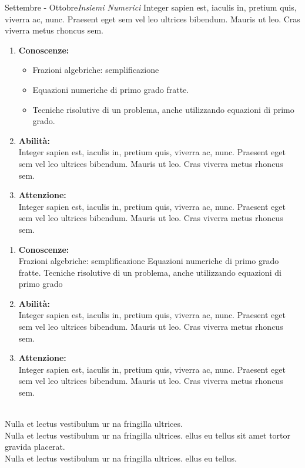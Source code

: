 \documentclass[10pt, a4paper twoside, notitlepage, notoc, justified]{tufte-handout}
\begin{document}
\begin{loggentry}{Settembre - Ottobre}{\em Insiemi Numerici}
Integer sapien est, iaculis in, pretium quis, viverra ac, nunc. Praesent eget sem vel leo ultrices bibendum. Mauris ut leo. Cras viverra metus rhoncus sem.

\begin{multicols}{2}
{\small
	\begin{enumerate}
		\item {\bf Conoscenze:}
		\begin{itemize}
			\item Frazioni algebriche: semplificazione
			\item Equazioni numeriche di primo grado fratte.
			\item Tecniche risolutive di un problema, anche utilizzando equazioni di primo grado.
			\end{itemize}
		\item {\bf Abilità:}\\ Integer sapien est, iaculis in, pretium quis, viverra ac, nunc. Praesent eget sem vel leo ultrices bibendum. Mauris ut leo. Cras viverra metus rhoncus sem.
		\item {\bf Attenzione:}\\ Integer sapien est, iaculis in, pretium quis, viverra ac, nunc. Praesent eget sem vel leo ultrices bibendum. Mauris ut leo. Cras viverra metus rhoncus sem.
	\end{enumerate} 
\columnbreak

\begin{enumerate}
		\item {\bf Conoscenze:}\\ Frazioni algebriche: semplificazione
Equazioni numeriche di primo grado fratte.
Tecniche risolutive di un problema, anche utilizzando equazioni di primo grado
		\item {\bf Abilità:}\\ Integer sapien est, iaculis in, pretium quis, viverra ac, nunc. Praesent eget sem vel leo ultrices bibendum. Mauris ut leo. Cras viverra metus rhoncus sem.
		\item {\bf Attenzione:}\\ Integer sapien est, iaculis in, pretium quis, viverra ac, nunc. Praesent eget sem vel leo ultrices bibendum. Mauris ut leo. Cras viverra metus rhoncus sem.
\end{enumerate}
}
\end{multicols}
\\ Nulla et lectus vestibulum ur na fringilla ultrices. \\ Nulla et lectus vestibulum ur na fringilla ultrices. ellus eu tellus sit amet tortor gravida placerat. 
\\ Nulla et lectus vestibulum ur na fringilla ultrices. ellus eu tellus.
\end{loggentry}
\end{document}
